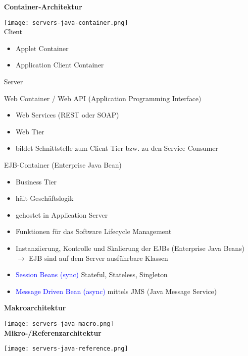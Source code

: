 \columnbreak
\textbf{Container-Architektur}

\texttt{[image: servers-java-container.png]} \\

Client

\begin{itemize}
    \item Applet Container
    \item Application Client Container
\end{itemize}
\vspace{10pt}
Server

Web Container / Web API (Application Programming Interface)

\begin{itemize}
    \item Web Services (REST oder SOAP)
    \item Web Tier
    \item bildet Schnittstelle zum Client Tier bzw. zu den Service Consumer
\end{itemize}
\vspace{10pt}
EJB-Container (Enterprise Java Bean)

\begin{itemize}
    \item Business Tier
    \item hält Geschäftslogik
    \item gehostet in Application Server
    \item Funktionen für das Software Lifecycle Management
    \item Instanziierung, Kontrolle und Skalierung der EJBs (Enterprise Java Beans) $\rightarrow$ EJB sind auf dem Server ausführbare Klassen
    \item \textcolor{blue}{Session Beans (sync)} Stateful, Stateless, Singleton
    \item \textcolor{blue}{Message Driven Bean (async)} mittels JMS (Java Message Service)
\end{itemize}
\vspace{10pt}
\textbf{Makroarchitektur}

\texttt{[image: servers-java-macro.png]} \\

\columnbreak
\textbf{Mikro-/Referenzarchitektur}

\texttt{[image: servers-java-reference.png]} \\

